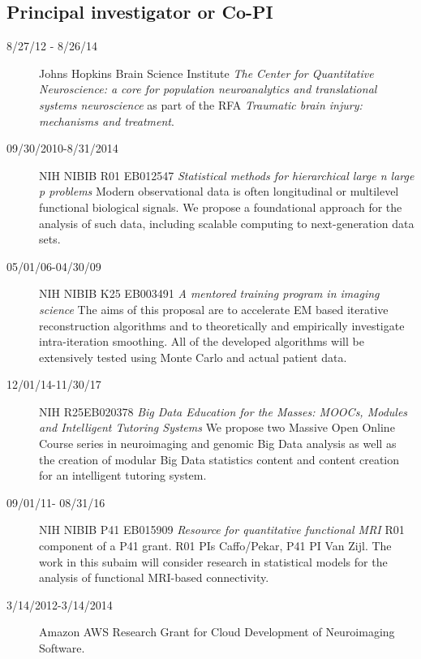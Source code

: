 \documentclass[12pt]{article}
\begin{document}
\subsection*{Principal investigator or Co-PI}
\begin{description}
\item[\textnormal{8/27/12 - 8/26/14}] Johns Hopkins Brain Science Institute {\it The Center for Quantitative Neuroscience: a core for population neuroanalytics and translational systems neuroscience} as part of the RFA {\it Traumatic brain injury: mechanisms and treatment}.
\item[\textnormal{09/30/2010-8/31/2014}] NIH NIBIB R01 EB012547 {\it Statistical methods for hierarchical large n large p problems} Modern observational data is often longitudinal or multilevel functional biological signals. We propose a foundational approach for the analysis of such data, including scalable computing to next-generation data sets.
\item[\textnormal{05/01/06-04/30/09}] NIH NIBIB K25 EB003491 {\it A
    mentored training program in imaging science} 
  The aims of this proposal are to accelerate EM based iterative
  reconstruction algorithms and to theoretically and empirically
  investigate intra-iteration smoothing.  All of the developed
  algorithms will be extensively tested using Monte Carlo and actual
  patient data.
\item[\textnormal{12/01/14-11/30/17}] NIH R25EB020378 {\it Big Data Education for the Masses: MOOCs, Modules and Intelligent Tutoring Systems} We propose two Massive Open Online Course series in neuroimaging and genomic Big Data analysis as well
as the creation of modular Big Data statistics content and content creation for an intelligent tutoring system.
\item[\textnormal{09/01/11- 08/31/16}] NIH NIBIB P41 EB015909 {\it Resource for quantitative functional MRI} R01 component of a P41 grant. R01 PIs Caffo/Pekar, P41 PI Van Zijl. The work in this subaim will consider research in statistical models for the analysis of functional MRI-based connectivity.
\item[\textnormal{3/14/2012-3/14/2014}] Amazon AWS Research Grant for Cloud Development of Neuroimaging Software.
\end{description}
\end{document}
